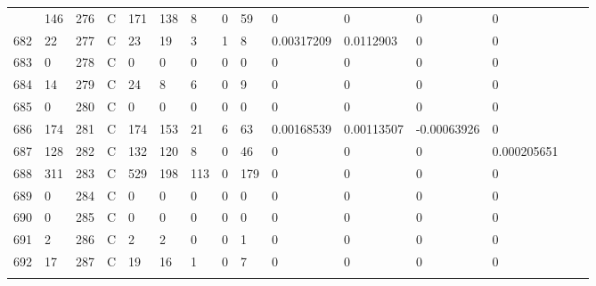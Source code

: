 \begin{longtable}{lllllllllllllll}
\begin{comment}
	681 & 146               & 276 & C   & 171               & 138               & 8                 & 0    & 59         & 0              & 0              & 0             & 0            \\
	682 & 22                & 277 & C   & 23                & 19                & 3                 & 1    & 8          & 0.00317209     & 0.0112903      & 0             & 0            \\
	683 & 0                 & 278 & C   & 0                 & 0                 & 0                 & 0    & 0          & 0              & 0              & 0             & 0            \\
	684 & 14                & 279 & C   & 24                & 8                 & 6                 & 0    & 9          & 0              & 0              & 0             & 0            \\
	685 & 0                 & 280 & C   & 0                 & 0                 & 0                 & 0    & 0          & 0              & 0              & 0             & 0            \\
	686 & 174               & 281 & C   & 174               & 153               & 21                & 6    & 63         & 0.00168539     & 0.00113507     & -0.00063926   & 0            \\
	687 & 128               & 282 & C   & 132               & 120               & 8                 & 0    & 46         & 0              & 0              & 0             & 0.000205651  \\
	688 & 311               & 283 & C   & 529               & 198               & 113               & 0    & 179        & 0              & 0              & 0             & 0            \\
	689 & 0                 & 284 & C   & 0                 & 0                 & 0                 & 0    & 0          & 0              & 0              & 0             & 0            \\
	690 & 0                 & 285 & C   & 0                 & 0                 & 0                 & 0    & 0          & 0              & 0              & 0             & 0            \\
	691 & 2                 & 286 & C   & 2                 & 2                 & 0                 & 0    & 1          & 0              & 0              & 0             & 0            \\
	692 & 17                & 287 & C   & 19                & 16                & 1                 & 0    & 7          & 0              & 0              & 0             & 0            \\

\end{comment}
\end{longtable}

